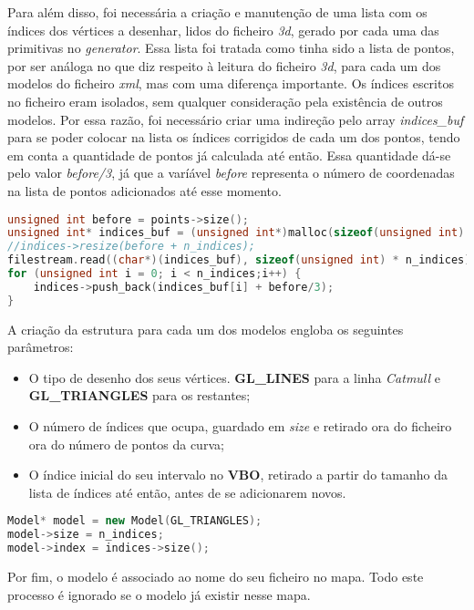 \documentclass[14pt, a4 paper]{report}
\begin{document}
Para além disso, foi necessária a criação e manutenção de uma lista com os índices dos vértices a desenhar, lidos do ficheiro \textit{3d}, gerado por cada uma das primitivas no \textit{generator}. Essa lista foi tratada como tinha sido a lista de pontos, por ser análoga no que diz respeito à leitura do ficheiro \textit{3d}, para cada um dos modelos do ficheiro \textit{xml}, mas com uma diferença importante. Os índices escritos no ficheiro eram isolados, sem qualquer consideração pela existência de outros modelos. Por essa razão, foi necessário criar uma indireção pelo array \textit{indices\_buf} para se poder colocar na lista os índices corrigidos de cada um dos pontos, tendo em conta a quantidade de pontos já calculada até então. Essa quantidade dá-se pelo valor \textit{before/3}, já que a varíável \textit{before} representa o número de coordenadas na lista de pontos adicionados até esse momento.

\begin{lstlisting}[language=c++]
unsigned int before = points->size();
unsigned int* indices_buf = (unsigned int*)malloc(sizeof(unsigned int) * n_indices);
//indices->resize(before + n_indices);
filestream.read((char*)(indices_buf), sizeof(unsigned int) * n_indices);
for (unsigned int i = 0; i < n_indices;i++) {
    indices->push_back(indices_buf[i] + before/3);
}
\end{lstlisting}

A criação da estrutura para cada um dos modelos engloba os seguintes parâmetros:

\begin{itemize}
    \item O tipo de desenho dos seus vértices. \textbf{GL\_LINES} para a linha \textit{Catmull} e \textbf{GL\_TRIANGLES} para os restantes;
    \item O número de índices que ocupa, guardado em \textit{size} e retirado ora do ficheiro ora do número de pontos da curva;
    \item O índice inicial do seu intervalo no \textbf{VBO}, retirado a partir do tamanho da lista de índices até então, antes de se adicionarem novos.
\end{itemize}

\begin{lstlisting}[language = c++]
Model* model = new Model(GL_TRIANGLES);
model->size = n_indices;
model->index = indices->size();
\end{lstlisting}

Por fim, o modelo é associado ao nome do seu ficheiro no mapa. Todo este processo é ignorado se o modelo já existir nesse mapa.
\end{document}
